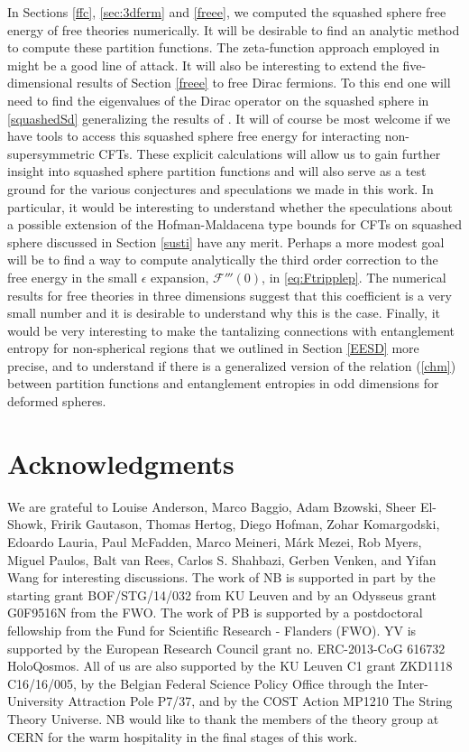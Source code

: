 \documentclass[12pt]{article}
\numberwithin{equation}{section}
\newcommand{\req}[1]{(\ref{#1})} %
\begin{document}
In Sections \ref{ffc}, \ref{sec:3dferm} and \ref{freee}, we computed the squashed sphere free energy of free theories numerically. It will be desirable to find an analytic method to compute these partition functions. The zeta-function approach employed in \cite{Hartnoll:2005yc} might be a good line of attack. It will also be interesting to extend the five-dimensional results of Section \ref{freee} to free Dirac fermions. To this end one will need to find the eigenvalues of the Dirac operator on the squashed sphere in \eqref{squashedSd} generalizing the results of \cite{Gibbons198098,Dowker:1998pi}. It will of course be most welcome if we have tools to access this squashed sphere free energy for interacting non-supersymmetric CFTs. These explicit calculations will allow us to gain further insight into squashed sphere partition functions and will also serve as a test ground for the various conjectures and speculations we made in this work. In particular, it would be interesting to understand whether the speculations about a possible extension of the Hofman-Maldacena type bounds for CFTs on squashed sphere discussed in Section \ref{susti} have any merit. Perhaps a more modest goal will be to find a way to compute analytically the third order correction to the free energy in the small $\epsilon$ expansion, $\mathcal{F}'''(0)$, in \eqref{eq:Ftripplep}. The numerical results for free theories in three dimensions suggest that this coefficient is a very small number and it is desirable to understand why this is the case. Finally, it would be very interesting to make the tantalizing connections with entanglement entropy for non-spherical regions that we outlined in Section \ref{EESD} more precise, and to understand if there is a generalized version of the relation \req{chm} between partition functions and entanglement entropies in odd dimensions for deformed spheres.



\section*{Acknowledgments}  

We are grateful to Louise Anderson, Marco Baggio, Adam Bzowski, Sheer El-Showk, Fri\dh rik Gautason, Thomas Hertog, Diego Hofman, Zohar Komargodski, Edoardo Lauria, Paul McFadden, Marco Meineri, M\'ark Mezei, Rob Myers, Miguel Paulos, Balt van Rees, Carlos S. Shahbazi, Gerben Venken, and Yifan Wang for interesting discussions. The work of NB is supported in part by the starting grant BOF/STG/14/032 from KU Leuven and by an Odysseus grant G0F9516N from the FWO. The work of PB is supported by a postdoctoral fellowship from the Fund for Scientific Research - Flanders (FWO). YV is supported by the European Research Council grant no. ERC-2013-CoG 616732 HoloQosmos. All of us are also supported by the KU Leuven C1 grant ZKD1118 C16/16/005, by the Belgian Federal Science Policy Office through the Inter-University Attraction Pole P7/37, and by the COST Action MP1210 The String Theory Universe. NB would like to thank the members of the theory group at CERN for the warm hospitality in the final stages of this work.
\end{document}
